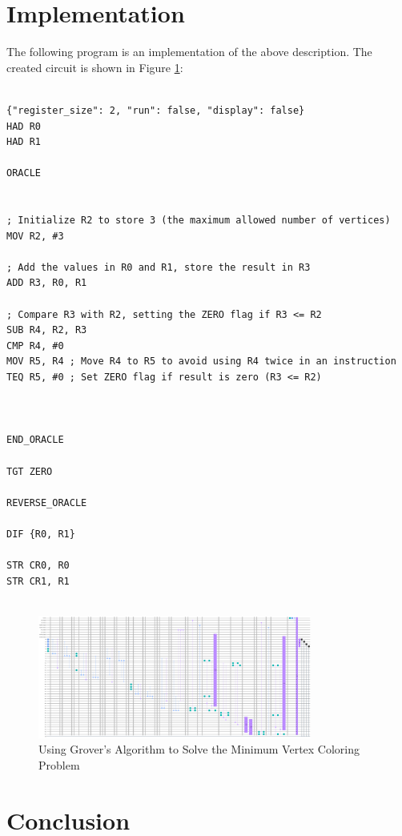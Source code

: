 \section{Implementation}

The following program is an implementation of the above description. The created circuit is shown in Figure \ref{fig:Minimum_Vertex_Coloring}:

\begin{lstlisting}

{"register_size": 2, "run": false, "display": false}
HAD R0
HAD R1

ORACLE


; Initialize R2 to store 3 (the maximum allowed number of vertices)
MOV R2, #3

; Add the values in R0 and R1, store the result in R3
ADD R3, R0, R1

; Compare R3 with R2, setting the ZERO flag if R3 <= R2
SUB R4, R2, R3
CMP R4, #0
MOV R5, R4 ; Move R4 to R5 to avoid using R4 twice in an instruction
TEQ R5, #0 ; Set ZERO flag if result is zero (R3 <= R2)



END_ORACLE

TGT ZERO

REVERSE_ORACLE

DIF {R0, R1}

STR CR0, R0
STR CR1, R1


\end{lstlisting}

\begin{figure}[htp]
    \centering
    \includegraphics[width=9cm]{Figures/Minimum_Vertex_Coloring_circuit.png}
    \caption{Using Grover's Algorithm to Solve the Minimum Vertex Coloring Problem}
    \label{fig:Minimum_Vertex_Coloring}
\end{figure}

\section{Conclusion}
\label{sec:conclusion}

